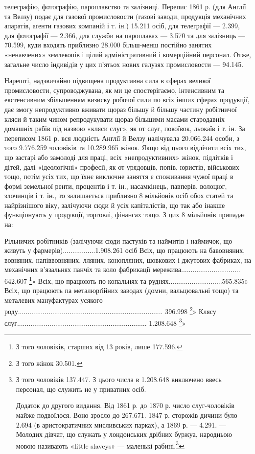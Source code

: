 \parcont{}  %
телеграфію, фотографію, пароплавство та залізниці. Перепис
1861 р. (для Англії та Велзу) подає для газової промисловости
(газові заводи, продукція механічних апаратів, аґенти газових
компаній і т. ін.) 15.211 осіб, для телеграфії — 2.399, для фотографії
— 2.366, для служби на пароплавах — 3.570 та для залізниць —
70.599, куди входять приблизно 28.000 більш-менш постійно
занятих «ненавчених» землекопів і цілий адміністративний і комерційний
персонал. Отже, загальне число індивідів у цих п’ятьох
нових галузях промисловости — 94.145.

Нарешті, надзвичайно підвищена продуктивна сила в сферах
великої промисловости, супроводжувана, як ми це спостерігаємо,
інтенсивним та екстенсивним збільшенням визиску робочої
сили по всіх інших сферах продукції, дає змогу непродуктивно
вживати щораз більшу й більшу частину робітничої кляси й таким
чином репродукувати щораз більшими масами стародавніх домашніх
рабів під назвою «кляси слуг», як от слуг, покоївок, льокаїв
і т. ін. За переписом 1861 р. вся людність Англії й Велзу налічувала
20.066.244 особи, з того 9.776.259 чоловіків та 10.289.965 жінок.
Якщо від цього відлічити всіх тих, що застарі або замолоді
для праці, всіх «непродуктивних» жінок, підлітків і дітей,
далі «ідеологічні» професії, як от урядовців, попів, юристів,
військових тощо, потім усіх тих, що їхнє виключне заняття є
споживання чужої праці в формі земельної ренти, процентів і
т. ін., насамкінець, павперів, волоцюг, злочинців і т. ін., то залишається
приблизно 8 мільйонів осіб обох статей та найрізнішого
віку, залічуючи сюди й усіх капіталістів, що так або інакше
функціонують у продукції, торговлі, фінансах тощо. З цих 8 мільйонів
припадає на:

Рільничих робітників (залічуючи сюди пастухів та
наймитів і наймичок, що живуть у фармерів).................1.908.261 осіб
Всіх, що працюють на бавовняних, вовняних, напіввовняних,
лляних, конопляних, шовкових
і джутових фабриках, на механічних в’язальнях
панчіх та коло фабрикації мережива............................... 642.607 \footnote{
З того чоловіків, старших від 13 років, лише 177.596.
}»
Всіх, що працюють по копальнях та руднях............................565.835»
Всіх, що працюють па металюрґійних заводах
(домни, вальцювальні тощо) та металевих мануфактурах усякого
роду............................................................................ 396.998 \footnote{
З того жінок 30.501.
}»
Клясу слуг.................................................................... 1.208.648 \footnote{
З того чоловіків 137.447. З цього числа в 1.208.648 виключено ввесь
персонал, що служить не у приватних осіб.

Додаток до другого видання. Від 1861 р. до 1870 р. число слуг-чоловіків
майже подвоїлося. Воно зросло до 267.671. 1847 р. сторожів дичини
було 2.694 (в аристократичних мисливських парках), а 1869 р. — 4.291.
— Молодих дівчат, що служать у лондонських дрібних буржуа, народньою
мовою називають «little slaveys» — маленькі рабині.\footnote*{
Тут у власному Марксовому примірнику 1 німецького видання є
така цитата з «Evening Star» від 11 вересня 1868 р.: «Як виснажують над-
}
}»

